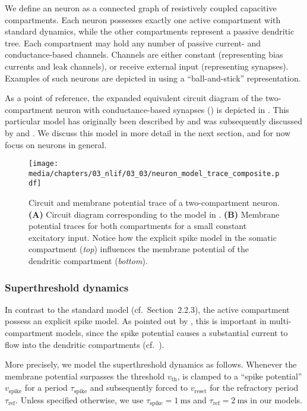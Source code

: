 We define an \nlif neuron as a connected graph of resistively coupled capacitive compartments.
Each neuron possesses exactly one active compartment with standard \LIF dynamics, while the other compartments represent a passive dendritic tree.
Each compartment may hold any number of passive current- and conductance-based channels.
Channels are either constant (representing bias currents and leak channels), or receive external input (representing synapses).
Examples of such neurons are depicted in  using a \enquote{ball-and-stick} representation.

As a point of reference, the expanded equivalent circuit diagram of the two-compartment neuron with conductance-based synapses () is depicted in .
This particular model has originally been described by \citet{vu1993mechanism} and was subsequently discussed by \citet{koch1999biophysics} and \citet{capaday2006direct}.
We discuss this model in more detail in the next section, and for now focus on \nlif neurons in general.

\begin{figure}
	\texttt{[image: media/chapters/03\_nlif/03\_03/neuron\_model\_trace\_composite.pdf]}%
	{\label{fig:two_comp_lif_circuit}}
	{\label{fig:two_comp_lif_trace}}
	\caption[Circuit and membrane potential trace of a two-compartment LIF neuron]{Circuit and membrane potential trace of a two-compartment neuron.
	\textbf{(A)} Circuit diagram corresponding to the model in .
	\textbf{(B)} Membrane potential traces for both compartments for a small constant excitatory input.
	Notice how the explicit spike model in the somatic compartment (\emph{top}) influences the membrane potential of the dendritic compartment (\emph{bottom}).}
	\label{fig:two_comp_lif}
\end{figure}

\subsubsection{Superthreshold dynamics}
In contrast to the standard \LIF model (cf.~Section~2.2.3), the active \nlif compartment possess an explicit spike model.
As pointed out by \citet{capaday2006direct}, this is important in multi-compartment models, since the spike potential causes a substantial current to flow into the dendritic compartments (cf.~).

More precisely, we model the superthreshold dynamics as follows.
Whenever the membrane potential \vMem surpasses the threshold $v_\mathrm{th}$, \vMem is clamped to a \enquote{spike potential} $v_\mathrm{spike}$ for a period $\tau_\mathrm{spike}$ and subsequently forced to $v_\mathrm{reset}$ for the refractory period $\tau_\mathrm{ref}$.
Unless specified otherwise, we use $\tau_\mathrm{spike} = \SI{1}{\milli\second}$ and $\tau_\mathrm{ref} = \SI{2}{\milli\second}$ in our models.

